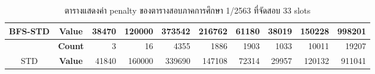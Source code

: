 \begin{table}[]
{\begin{tabular}{@{}ccrrrrrrrr@{}}
    \multirow{-2}{*}{BFS-STD}                    & \textbf{Value}                        & 38470                          & 120000                         & 373542                         & 216762                         & 61180                          & 38019                          & 150228                         & 998201                           \\ \midrule
                                                  & {\textbf{Count}} & {3}       & {16}      & {4355}    & {1886}    & {1903}    & {1033}    & {10011}   & {19207}     \\ \cmidrule(l){2-10} 
    \multirow{-2}{*}{STD} & {\textbf{Value}} & {41840}   & {160000}  & {339690}  & {147108}  & {72314}   & {29957}   & {120132}  & {911041}    \\ \bottomrule
    \end{tabular}%
    }
    \caption{ตารางแสดงค่า penalty ของตารางสอบภาคการศึกษา 1/2563 ที่จัดสอบ 33 slots}
    \label{tab:result_table_163_33}
\end{table}
